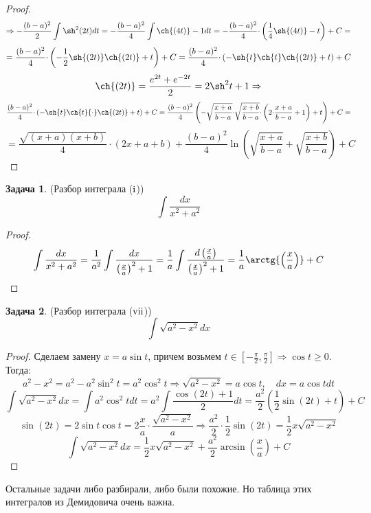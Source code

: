 \documentclass[12pt]{article}
\newcommand{\RN}[1]{%
	\textup{\uppercase\expandafter{\romannumeral#1}}%
}
\theoremstyle{definition}
\newtheorem{problem}{Задача}
\DeclareMathOperator{\dint}{\displaystyle\int}
\begin{document}
\begin{proof}
$$	$$
	$$
		\Rightarrow -\dfrac{(b-a)^2}{2}\dint \sh^2{(2t)}dt = -\dfrac{(b-a)^2}{4}\dint \ch{(4t)} - 1 dt = -\dfrac{(b-a)^2}{4}{\cdot}\left(\dfrac{1}{4}\sh{(4t)} - t\right) + C =
	$$
	$$
		=	\dfrac{(b-a)^2}{4}{\cdot}\left(-\dfrac{1}{2}\sh{(2t)}\ch{(2t)} + t\right) + C = \dfrac{(b-a)^2}{4}{\cdot}\left(-\sh{t}\ch{t}\ch{(2t)} + t\right) + C
	$$
	$$
		\ch{(2t)} = \dfrac{e^{2t} + e^{-2t}}{2} = 2\sh^2{t} + 1  \Rightarrow
	$$
	$$
		\dfrac{(b-a)^2}{4}{\cdot}\left(-\sh{t}\ch{t}{\cdot}\ch{(2t)} + t\right) + C =	\dfrac{(b-a)^2}{4}\left(-\sqrt{\dfrac{x+a}{b-a}}{\cdot}\sqrt{\dfrac{x + b}{b-a}}{\cdot}\left( 2{\cdot}\dfrac{x+a}{b-a} + 1\right) +t \right) +C = 
	$$
	$$
		=	\dfrac{\sqrt{(x+a)(x+b)}}{4}{\cdot}(2x + a + b) + \dfrac{(b-a)^2}{4}\ln{\left(\sqrt{\dfrac{x+a}{b-a}} + \sqrt{\dfrac{x+b}{b-a}}\right)} +C
	$$
\end{proof}

\begin{problem}(Разбор интеграла ($\RN{1}$)) 
	$$
		\dint \dfrac{dx}{x^2 + a^2}
	$$
\end{problem}
\begin{proof}
	$$
		\dint \dfrac{dx}{x^2 + a^2} = \dfrac{1}{a^2}\dint \dfrac{dx}{\left(\frac{x}{a}\right)^2 + 1} = \dfrac{1}{a}\dint \dfrac{d\left(\frac{x}{a}\right)}{\left(\frac{x}{a}\right)^2 + 1} = \dfrac{1}{a}\arctg{\left(\dfrac{x}{a}\right)} + C
	$$
\end{proof}


\begin{problem}(Разбор интеграла ($\RN{7}$)) 
	$$
		\dint \sqrt{a^2 -x^2}dx
	$$
\end{problem}
\begin{proof}
	Сделаем замену $x = a \sin{t}$, причем возьмем $t \in \left[-\frac{\pi}{2}, \frac{\pi}{2}\right] \Rightarrow \cos{t} \geq 0$. Тогда:
	$$
		a^2 - x^2 = a^2 - a^2\sin^2{t} = a^2\cos^2{t} \Rightarrow \sqrt{a^2 - x^2} = a\cos{t}, \quad dx = a\cos{t}dt
	$$
	$$
		\dint \sqrt{a^2 -x^2}dx = \dint a^2\cos^2{t}dt = a^2 \dint \dfrac{\cos{(2t)} + 1}{2}dt = \dfrac{a^2}{2}\left(\dfrac{1}{2}\sin{(2t)} + t\right) + C
	$$
	$$
		\sin{(2t)} = 2\sin{t}\cos{t} = 2\dfrac{x}{a}{\cdot}\dfrac{\sqrt{a^2 - x^2}}{a} \Rightarrow \dfrac{a^2}{2}{\cdot}\dfrac{1}{2}\sin{(2t)} = \dfrac{1}{2}x\sqrt{a^2 - x^2}
	$$
	$$	
		\dint \sqrt{a^2 -x^2}dx = \dfrac{1}{2}x\sqrt{a^2 -  x^2} + \dfrac{a^2}{2}\arcsin{\left(\dfrac{x}{a}\right)} + C
	$$
\end{proof}

Остальные задачи либо разбирали, либо были похожие. Но таблица этих интегралов из Демидовича очень важна.
\end{document}
